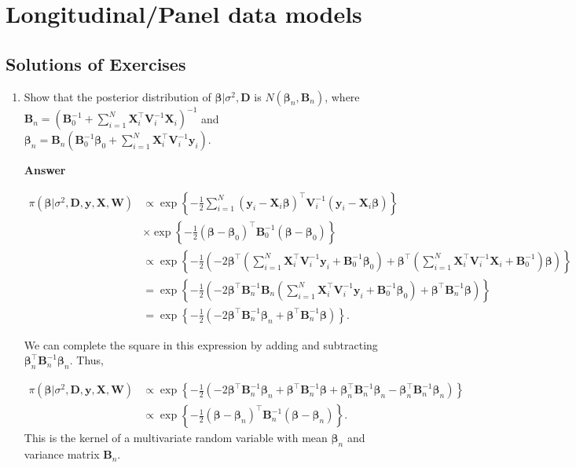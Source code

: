 \chapter{Longitudinal/Panel data models}\label{chap9}

\section{Solutions of Exercises}\label{sec91}
\begin{enumerate}[leftmargin=*]

	\item Show that the posterior distribution of $\bm{\beta}|\sigma^2,\bm{D}$ is $N(\bm{\beta}_n,\bm{B}_n)$, where $\bm{B}_n = (\bm{B}_0^{-1} +\sum_{i=1}^N \bm{X}_i^{\top}\bm{V}_i^{-1}\bm{X}_i)^{-1}$ and $\bm{\beta}_n= \bm{B}_n(\bm{B}_0^{-1}\bm{\beta}_0 + \sum_{i=1}^N\bm{X}_i^{\top}\bm{V}_i^{-1}\bm{y}_i)$.
	
	\textbf{Answer}

{\footnotesize	
	\begin{align*}
		\pi(\bm{\beta}|\sigma^2, \bm{D},\bm{y},\bm{X},\bm{W}) & \propto \exp\left\{-\frac{1}{2}\sum_{i=1}^N(\bm{y}_i-\bm{X}_i\bm{\beta})^{\top}\bm{V}_i^{-1}(\bm{y}_i-\bm{X}_i\bm{\beta})\right\}\\
		&\times \exp\left\{-\frac{1}{2}(\bm{\beta}-\bm{\beta}_0)^{\top}\bm{B}_0^{-1}(\bm{\beta}-\bm{\beta}_0)\right\}\\
		& \propto \exp\left\{-\frac{1}{2}\left(-2\bm{\beta}^{\top}\left(\sum_{i=1}^N\bm{X}_i^{\top}\bm{V}_i^{-1}\bm{y}_i+\bm{B}_0^{-1}\bm{\beta}_0\right)+\bm{\beta}^{\top}\left(\sum_{i=1}^N\bm{X}_i^{\top}\bm{V}_i^{-1}\bm{X}_i+\bm{B}_0^{-1}\right)\bm{\beta}\right)\right\}\\
		& = \exp\left\{-\frac{1}{2}(-2\bm{\beta}^{\top}\bm{B}_n^{-1}\bm{B}_n\left(\sum_{i=1}^N\bm{X}_i^{\top}\bm{V}_i^{-1}\bm{y}_i+\bm{B}_0^{-1}\bm{\beta}_0\right)+\bm{\beta}^{\top}\bm{B}_n^{-1}\bm{\beta})\right\}\\
		& = \exp\left\{-\frac{1}{2}(-2\bm{\beta}^{\top}\bm{B}_n^{-1}\bm{\beta}_n+\bm{\beta}^{\top}\bm{B}_n^{-1}\bm{\beta})\right\}. 
	\end{align*} 
}

We can complete the square in this expression by adding and subtracting $\bm{\beta}_n^{\top}\bm{B}_n^{-1}\bm{\beta}_n$. Thus,

	\begin{align*}
	\pi(\bm{\beta}|\sigma^2, \bm{D},\bm{y},\bm{X},\bm{W}) & \propto \exp\left\{-\frac{1}{2}(-2\bm{\beta}^{\top}\bm{B}_n^{-1}\bm{\beta}_n+\bm{\beta}^{\top}\bm{B}_n^{-1}\bm{\beta}+\bm{\beta}_n^{\top}\bm{B}_n^{-1}\bm{\beta}_n-\bm{\beta}_n^{\top}\bm{B}_n^{-1}\bm{\beta}_n)\right\}\\
	&\propto \exp\left\{-\frac{1}{2}(\bm{\beta}-\bm{\beta}_n)^{\top}\bm{B}_n^{-1}(\bm{\beta}-\bm{\beta}_n)\right\}.
\end{align*} 
This is the kernel of a multivariate random variable with mean $\bm{\beta}_n$ and variance matrix $\bm{B}_n$.
	

\end{enumerate}
